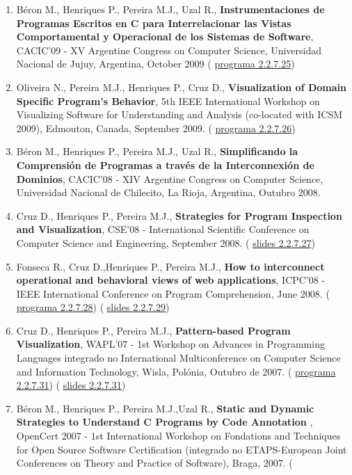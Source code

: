 \documentclass[11pt]{article}
\begin{document}
\begin{enumerate}
\item{Béron M., Henriques P., Pereira M.J., Uzal R., {
\bf{ Instrumentaciones de Programas Escritos en C para Interrelacionar las Vistas Comportamental y Operacional de los Sistemas de Software}}, CACIC'09 - XV Argentine Congress on Computer Science, Universidad Nacional de Jujuy, Argentina, October 2009 (
\href{run:ComunicacoesOrais/programas/CACIC2009.pdf}{programa 2.2.7.25})}
\item{Oliveira N., Pereira M.J., Henriques P., Cruz D., {
\bf{ Visualization of Domain Specific Program's Behavior}}, 5th IEEE International Workshop on Visualizing Software for Understanding and Analysis (co-located with ICSM 2009), Edmouton, Canada, September 2009. (
\href{run:ComunicacoesOrais/programas/VISSOFT2009.pdf}{programa 2.2.7.26})}
\item{Béron M., Henriques P., Pereira M.J., Uzal R., {
\bf{ Simplificando la Comprensión de Programas a través de la Interconnexión de Dominios}}, CACIC'08 - XIV Argentine Congress on Computer Science, Universidad Nacional de Chilecito, La Rioja, Argentina, Outubro 2008.}
\item{Cruz D., Henriques P., Pereira M.J., {
\bf{ Strategies for Program Inspection and Visualization}}, CSE'08 - International Scientific Conference on Computer Science and Engineering, September 2008. (
\href{run:ComunicacoesOrais/CSE08apres.pdf}{slides 2.2.7.27})}
\item{Fonseca R., Cruz D.,Henriques P., Pereira M.J., {
\bf{ How to interconnect operational and behavioral views of web applications}}, ICPC'08 - IEEE International Conference on Program Comprehension, June 2008. (
\href{run:ComunicacoesOrais/programas/ICPC2008.pdf}{programa 2.2.7.28}) (
\href{run:ComunicacoesOrais/ICPC08apres.pdf}{slides 2.2.7.29})}
\item{Cruz D., Henriques P., Pereira M.J., {
\bf{ Pattern-based Program Visualization}}, WAPL'07 - 1st Workshop on Advances in Programming Languages integrado no International Multiconference on Computer Science and Information Technology, Wisla, Polónia, Outubro de 2007. (
\href{run:ComunicacoesOrais/programas/WAPL2007.pdf}{programa 2.2.7.31}) (
\href{run:ComunicacoesOrais/WAPL2007apres.pdf}{slides 2.2.7.31})}
\item{Béron M., Henriques P., Pereira M.J.,Uzal R., {
\bf{ Static and Dynamic Strategies to Understand C Programs by Code Annotation}} , OpenCert 2007 - 1st International Workshop on Fondations and Techniques for Open Source Software Certification (integrado no ETAPS-European Joint Conferences on Theory and Practice of Software), Braga, 2007. (
}
\end{enumerate}
\end{document}
